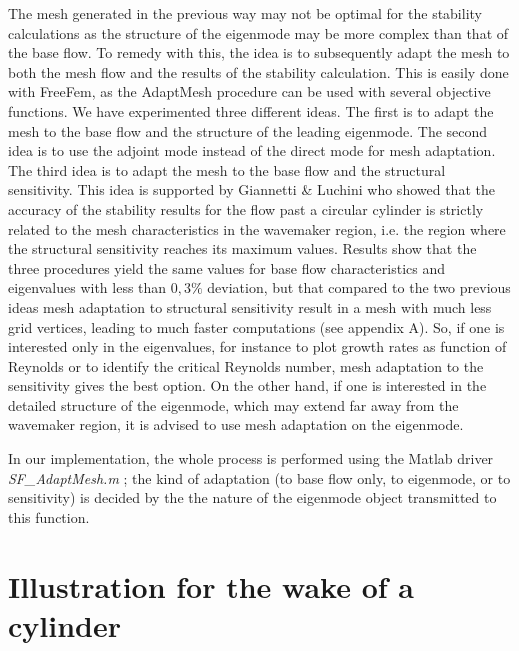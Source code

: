 \documentclass[twocolumn,10pt]{asme2ej}
\begin{document}
The mesh generated in the previous way may not be optimal for the stability calculations as the structure of the eigenmode may be more complex than that of the base flow. To remedy with this, the idea is to subsequently adapt the mesh to both the mesh flow and the results of the stability calculation. This is easily done with FreeFem, as the  AdaptMesh procedure can be used with several objective functions. We have experimented three different ideas. The first is to adapt the mesh to the base flow and the structure of the leading eigenmode. The second idea is to use the adjoint mode instead of the direct mode for mesh adaptation.
The third idea is to adapt the mesh to the base flow and the structural sensitivity. This idea is supported by Giannetti \& Luchini\cite{GiannettiLuchini} who showed that the accuracy of the stability results for the flow past a circular cylinder is strictly related to the mesh characteristics in the wavemaker region, i.e. the region where the structural sensitivity reaches its maximum values. 
Results show that the three procedures yield the same values for base flow characteristics and eigenvalues with less than $0,3\%$ deviation, but that compared to the two previous ideas mesh adaptation to structural sensitivity result in a mesh with much less grid vertices, leading to much faster computations (see appendix A). So, if one is interested only in the eigenvalues, for instance to plot growth rates as function of Reynolds or to identify the critical Reynolds number, mesh adaptation to the sensitivity gives the best option. On the other hand, if one is interested in the detailed structure of the eigenmode, which may extend far away from the wavemaker region, it is advised to use mesh adaptation on the eigenmode. 

In our implementation, the whole process is performed using the Matlab driver {\em SF\_AdaptMesh.m} ; the kind of adaptation  (to base flow only, to eigenmode, or to sensitivity) is decided by the the nature of the eigenmode object transmitted to this function.






\section{Illustration for the wake of a cylinder} 
\vspace{.2cm}
\end{document}
